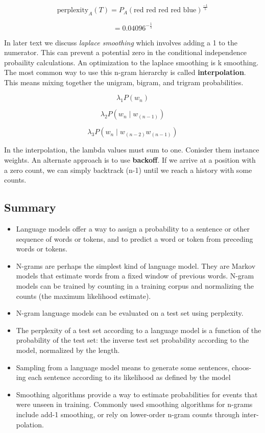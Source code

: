 \documentclass{article}
\begin{document}
\[
    \text{perplexity}_{A}(T) = P_A(\text{red red red red blue})^{\frac{-1}{5}}
\]

\[
    = 0.04096^{-\frac{1}{5}}
\]

In later text we discuss \textit{laplace smoothing} which involves adding a 1 to the numerator. This can prevent
a potential zero in the conditional independence probaility calculations. An optimization to the laplace smoothing is k smoothing.
The most common way to use this n-gram hierarchy is called \textbf{interpolation}. This means mixing together the unigram, bigram, and trigram probabilities.

\[
    \lambda_1 P(w_n)
\]

\[
    \lambda_2 P(w_n \mid w_{(n-1)})
\]

\[
    \lambda_3 P(w_n \mid w_{(n-2)}w_{(n-1)})
\]

In the interpolation, the lambda values must sum to one. Conisder them instance weights. An alternate approach is to use \textbf{backoff}.
If we arrive at a position with a zero count, we can simply backtrack (n-1) until we reach a history with some counts.


\subsection{Summary}

\begin{itemize}
    \item Language models offer a way to assign a probability to a sentence or other
          sequence of words or tokens, and to predict a word or token from preceding
          words or tokens.
    \item N-grams are perhaps the simplest kind of language model. They are Markov
          models that estimate words from a fixed window of previous words. N-gram
          models can be trained by counting in a training corpus and normalizing the
          counts (the maximum likelihood estimate).
    \item N-gram language models can be evaluated on a test set using perplexity.
    \item The perplexity of a test set according to a language model is a function of
          the probability of the test set: the inverse test set probability according to the
          model, normalized by the length.
    \item Sampling from a language model means to generate some sentences, choos-
          ing each sentence according to its likelihood as defined by the model
    \item Smoothing algorithms provide a way to estimate probabilities for events that
          were unseen in training. Commonly used smoothing algorithms for n-grams
          include add-1 smoothing, or rely on lower-order n-gram counts through inter-
          polation.
\end{itemize}
\end{document}
